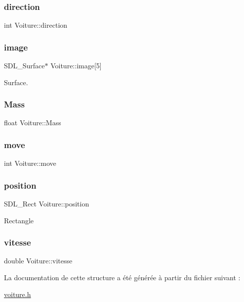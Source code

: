 \mbox{\label{structVoiture_a9bb35d6796c9a008309a574e14984227}} 
\subsubsection{\texorpdfstring{direction}{direction}}
{\footnotesize\ttfamily int Voiture\+::direction}

\mbox{\label{structVoiture_aeeb926bfdf6133f6c0e4e7c6c1a09394}} 
\subsubsection{\texorpdfstring{image}{image}}
{\footnotesize\ttfamily S\+D\+L\+\_\+\+Surface$\ast$ Voiture\+::image\mbox{[}5\mbox{]}}

Surface. \mbox{\label{structVoiture_a017e4fa03a51b03bbf72232bf33fa2f7}} 
\subsubsection{\texorpdfstring{Mass}{Mass}}
{\footnotesize\ttfamily float Voiture\+::\+Mass}

\mbox{\label{structVoiture_a71f00083102cac3802ca4fc5686c9b28}} 
\subsubsection{\texorpdfstring{move}{move}}
{\footnotesize\ttfamily int Voiture\+::move}

\mbox{\label{structVoiture_a68748b5ea1dfc3d0d2797f675e03f139}} 
\subsubsection{\texorpdfstring{position}{position}}
{\footnotesize\ttfamily S\+D\+L\+\_\+\+Rect Voiture\+::position}

Rectangle \mbox{\label{structVoiture_ad4b4d14b11ebddd488eda893e3438bb3}} 
\subsubsection{\texorpdfstring{vitesse}{vitesse}}
{\footnotesize\ttfamily double Voiture\+::vitesse}



La documentation de cette structure a été générée à partir du fichier suivant \+:\begin{DoxyCompactItemize}
\item 
\hyperlink{voiture_8h}{voiture.\+h}\end{DoxyCompactItemize}
